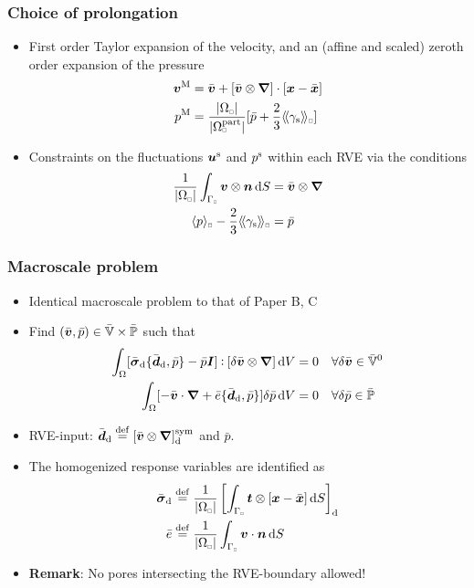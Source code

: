 \documentclass[11pt]{beamer} %
\DeclarePairedDelimiter{\homgen}{\langle}{\rangle_\rve}
\DeclarePairedDelimiter{\shomgen}{\langle\!\langle}{\rangle\!\rangle_\rve}
\renewcommand{\dev}{\mathrm{d}}
\newcommand{\volume}{|\Omega_\rve|}
\newcommand{\surf}{\mathrm{s}}
\newcommand{\particle}{\mathrm{part}}
\newcommand{\rve}{
  {\mathchoice
   {\mbox{\scalebox{0.67}{$\Box$}}}
   {\mbox{\scalebox{0.67}{$\Box$}}}
   {\mbox{\scalebox{0.5}{$\Box$}}}
   {\mbox{\scalebox{0.375}{$\Box$}}}
  }
}
\begin{document}
\begin{frame}
 \frametitle{Choice of prolongation}
\begin{itemize}
 \item First order Taylor expansion of the velocity, and an (affine and scaled) zeroth order expansion of the pressure 
\begin{align*}
 \ta v^\macro &= \bar{\ta v} + [\bar{\ta v}\outerp\diff]\cdot[\ta x - \bar{\ta x}]
\\
 p^\macro &= \frac{\volume}{|\Omega_\rve^\particle|}[\bar{p} + \frac23\shomgen{\gamma_\surf}]
\end{align*}
\item Constraints on the fluctuations $\boldsymbol{u}^{\mathrm{s}}$ and $p^{\mathrm{s}}$ within each RVE via the conditions
\begin{align*}
 \frac{1}{\volume}\int_{\Gamma_\rve}\ta v\outerp\ta n\dif S &= \bar{\ta v}\outerp\diff
\\
 \homgen{p} - \frac23\shomgen{\gamma_\surf} &= \bar{p}
\end{align*}
\end{itemize}
\end{frame}

\begin{frame}
 \frametitle{Macroscale problem}
\begin{itemize}
 \item Identical macroscale problem to that of Paper B, C
\color{gray}
 \item Find $(\bar{\boldsymbol{v}}, \bar{p}) \in \bar{\mathbb{V}}\times\bar{\mathbb{P}}$ such that
 \begin{align*}
  \int_\Omega [{\bar{\ts\sigma}_\dev\{\bar{\ts d}_\dev, \bar{p}\}} - \bar{p}\ts I]\dprod[\delta\bar{\ta v}\outerp\diff]\dif V &= 0\quad \forall \delta\bar{\ta v} \in \bar{\set{V}}^0
\\
  \int_\Omega [-\bar{\ta v}\cdot\diff + {\bar{e}\{\bar{\ts d}_\dev, \bar{p}\}}]\delta\bar{p}\dif V &= 0\quad \forall \delta\bar{p} \in \bar{\set{P}}
 \end{align*}
 \item RVE-input: $\bar{\ts d}_\dev\defeq [\bar{\ta v}\outerp\diff]^\sym_\dev$ and $\bar{p}$.
 \item The homogenized response variables are identified as
 \begin{align*}
 \bar{\ts\sigma}_\dev &\defeq \frac{1}{\volume} \left[\int_{\Gamma_\rve} \ta t \outerp [\ta x-\bar{\ta x}]\dif S\right]_\dev
\\
 \bar{e} &\defeq \frac{1}{\volume} \int_{\Gamma_\rve} \ta v \cdot \ta n\dif S
 \end{align*}
\color{black}
 \item \textbf{Remark}: No pores intersecting the RVE-boundary allowed!
\end{itemize}
\end{frame}
\end{document}
